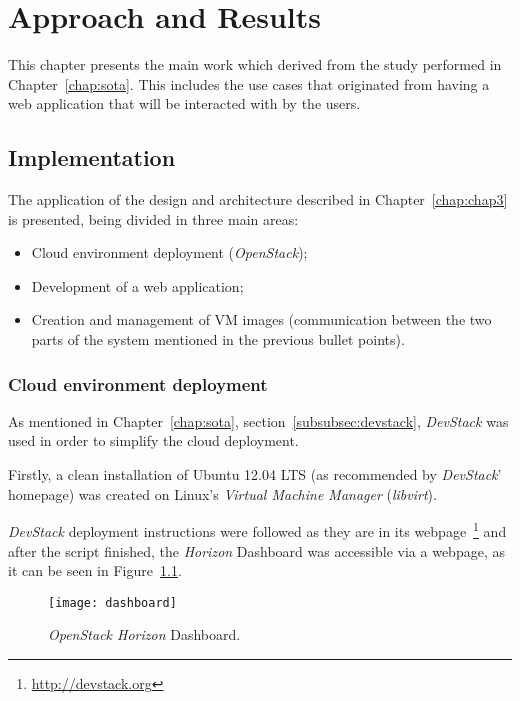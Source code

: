 \chapter{Approach and Results}\label{chap:chap4}


This chapter presents the main work which derived from the study performed in Chapter~\ref{chap:sota}. This includes the use cases that originated from having a web application that will be interacted with by the users. 


\section{Implementation}\label{sec:implementation}


The application of the design and architecture described in Chapter~\ref{chap:chap3} is presented, being divided in three main areas:

\begin{itemize}
\item Cloud environment deployment (\textit{OpenStack});
\item Development of a web application;
\item Creation and management of VM images (communication between the two parts of the system mentioned in the previous bullet points).
\end{itemize}

\subsection{Cloud environment deployment}\label{subsec:cloud_env}

As mentioned in Chapter~\ref{chap:sota}, section~\ref{subsubsec:devstack}, \textit{DevStack} was used in order to simplify the cloud deployment.

Firstly, a clean installation of Ubuntu 12.04 LTS (as recommended by \textit{DevStack}' homepage) was created on Linux's \textit{Virtual Machine Manager} (\textit{libvirt}).

\textit{DevStack} deployment instructions were followed as they are in its webpage~\footnote{\url{http://devstack.org}} and after the script finished, the \textit{Horizon} Dashboard was accessible via a webpage, as it can be seen in Figure~\ref{fig:stack-dashboard}.

\begin{figure}[t]
  \begin{center}
    \leavevmode
    \texttt{[image: dashboard]}
    \caption{\textit{OpenStack Horizon} Dashboard.}
    \label{fig:stack-dashboard}
  \end{center}
\end{figure}

